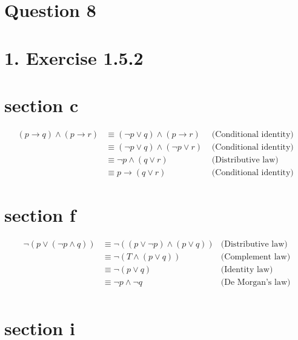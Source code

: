 \documentclass[10pt]{article}
\begin{document}
\pagebreak
\section*{Question 8}
\section*{1. Exercise 1.5.2}
\section*{section c}

$$
\begin{aligned}
(p \rightarrow q) \wedge(p \rightarrow r) & \equiv(\neg p \vee q) \wedge(p \rightarrow r) & \text { (Conditional identity) } \\
& \equiv(\neg p \vee q) \wedge(\neg p \vee r) & \text { (Conditional identity) } \\
& \equiv \neg p \wedge(q \vee r) & \text { (Distributive law) } \\
& \equiv p \rightarrow(q \vee r) & \text { (Conditional identity) }
\end{aligned}
$$

\section*{section f}

$$
\begin{aligned}
\neg(p \vee(\neg p \wedge q)) & \equiv \neg((p \vee \neg p) \wedge(p \vee q)) & \text {(Distributive law)}\\
& \equiv \neg(T \wedge(p \vee q)) & \text {(Complement law)}\\
& \equiv \neg(p \vee q)  & \text {(Identity law)}\\
& \equiv \neg p \wedge \neg q & \text {(De Morgan's law)} \\
\end{aligned}
$$

\section*{section i}
\end{document}
